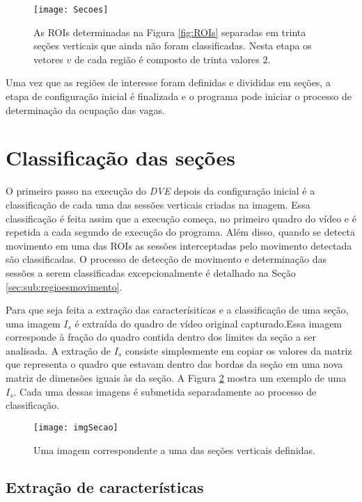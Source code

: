 \begin{figure}
	\centering
	\texttt{[image: Secoes]}
	\caption{As ROIs determinadas na Figura \ref{fig:ROIs} separadas em trinta seções verticais que ainda não foram classificadas. Nesta etapa os vetores $v$ de cada região é composto de trinta valores $2$.}
	\label{fig:secoesVerticais}
	\centering
\end{figure}


Uma vez que as regiões de interesse foram definidas e divididas em seções, a etapa de configuração inicial é finalizada e o programa pode iniciar o processo de determinação da ocupação das vagas. 

\section{Classificação das seções} \label{sec:classificacao}

O primeiro passo na execução do \textit{DVE} depois da configuração inicial é a classificação de cada uma das sessões verticais criadas na imagem. Essa classificação é feita assim que a execução começa, no primeiro quadro do vídeo e é repetida a cada segundo de execução do programa. Além disso, quando se detecta movimento em uma das ROIs as sessões interceptadas pelo movimento detectada são classificadas. O processo de detecção de movimento e determinação das sessões a serem classificadas excepcionalmente é detalhado na Seção \ref{sec:sub:regioesmovimento}.

Para que seja feita a extração das caracterísiticas e a classificação de uma seção, uma imagem $I_s$ é extraída do quadro de vídeo original capturado.Essa imagem corresponde à fração do quadro contida dentro dos limites da seção a ser analisada. A extração de $I_s$ consiste simplesmente em copiar os valores da matriz que representa o quadro que estavam dentro das bordas da seção em uma nova matriz de dimensões iguais às da seção. A Figura \ref{fig:imgSecao} mostra um exemplo de uma $I_s$. Cada uma dessas imagens é submetida separadamente ao processo de classificação.

\begin{figure}
	\centering
	\texttt{[image: imgSecao]}
	\caption{Uma imagem correspondente a uma das seções verticais definidas.}
	\label{fig:imgSecao}
	\centering
\end{figure}


\subsection{Extração de características}\label{sec:extracao}

